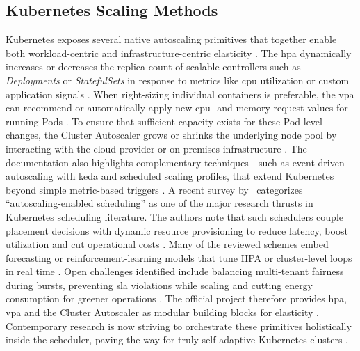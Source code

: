 \documentclass[11pt, a4paper, oneside, listof=totoc]{scrartcl}
\begin{document}
            \cleardoublepage

        \subsection{Kubernetes Scaling Methods}\label{subsec:k8sScaling}
            Kubernetes exposes several native autoscaling primitives that together enable both
            workload-centric and infrastructure-centric elasticity
            \parencite{kubernetesAutoscaling}.
            The \gls{hpa} dynamically increases or decreases the replica count of scalable
            controllers such as \textit{Deployments} or \textit{StatefulSets} in response to metrics
            like \gls{cpu} utilization or custom application signals
            \parencite{kubernetesAutoscaling}.
            When right-sizing individual containers is preferable, the \gls{vpa} can recommend or
            automatically apply new \gls{cpu}- and memory-request values for running Pods
            \parencite{kubernetesAutoscaling}.
            To ensure that sufficient capacity exists for these Pod-level changes, the Cluster
            Autoscaler grows or shrinks the underlying node pool by interacting with the cloud
            provider or on-premises infrastructure \parencite{kubernetesAutoscaling}.
            The documentation also highlights complementary techniques—such as event-driven
            autoscaling with \gls{keda} and scheduled scaling profiles, that extend Kubernetes
            beyond simple metric-based triggers \parencite{kubernetesAutoscaling}.
            A recent survey by~\cite[p.~1]{senjab2023} categorizes
            \enquote{autoscaling-enabled scheduling} as one of the major research thrusts in
            Kubernetes scheduling literature.
            The authors note that such schedulers couple placement decisions with dynamic resource
            provisioning to reduce latency, boost utilization and cut operational costs
            \parencite[p.~20]{senjab2023}.
            Many of the reviewed schemes embed forecasting or reinforcement-learning models that
            tune HPA or cluster-level loops in real time \parencite[pp.~16--19]{senjab2023}.
            Open challenges identified include balancing multi-tenant fairness during bursts,
            preventing \gls{sla} violations while scaling and cutting energy consumption for greener
            operations \parencite[pp.~20--23]{senjab2023}.
            The official project therefore provides \gls{hpa}, \gls{vpa} and the Cluster Autoscaler
            as modular building blocks for elasticity \parencite{kubernetesAutoscaling}.
            Contemporary research is now striving to orchestrate these primitives holistically
            inside the scheduler, paving the way for truly self-adaptive Kubernetes clusters
            \parencites[pp.~6--7]{senjab2023}[p.~22]{senjab2023}.
\end{document}
